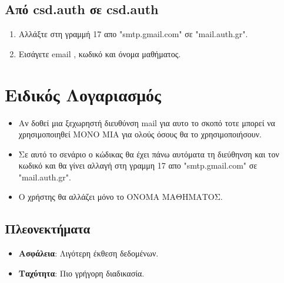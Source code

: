 \documentclass[a4paper,12pt]{article}
\begin{document}
\subsection{Από  csd.auth  σε  csd.auth }
\begin{enumerate}
    \item Αλλάξτε στη γραμμή 17 απο  "smtp.gmail.com" σε "mail.auth.gr". 
    \item Εισάγετε  email , κωδικό και όνομα μαθήματος.
\end{enumerate}

\section{Ειδικός Λογαριασμός}
\begin{itemize}
    γραμμη 17 πρέπει να είναι : SMTP\_SERVER = "mail.auth.gr" 
    \item Αν δοθεί μια ξεχωρηστή διευθύνση mail για αυτο το σκοπό τοτε μπορεί να χρησιμοποιηθεί ΜΟΝΟ ΜΙΑ για ολούς όσους θα το χρησιμοποιήσουν.
    \item Σε αυτό το σενάριο ο κώδικας θα έχει πάνω αυτόματα τη διεύθηνση και τον κωδικό και θα γίνει αλλαγή στη γραμμη 17 απο "smtp.gmail.com" σε "mail.auth.gr".
    \item Ο χρήστης θα αλλάζει μόνο το ΟΝΟΜΑ ΜΑΘΗΜΑΤΟΣ.
	
\end{itemize}

\subsection{Πλεονεκτήματα}
\begin{itemize}
    \item \textbf{Ασφάλεια}: Λιγότερη έκθεση δεδομένων.
    \item \textbf{Ταχύτητα}: Πιο γρήγορη διαδικασία.
\end{itemize}
\end{document}
